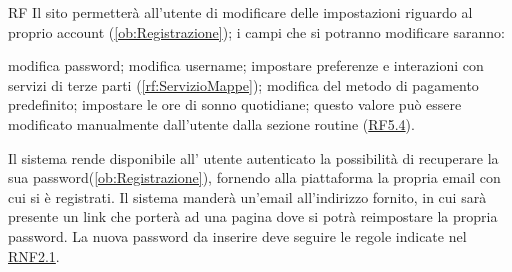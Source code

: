 \begin{listaPersonale}{RF}
	 Il sito permetterà all'utente di modificare delle impostazioni riguardo al proprio account (\ref{ob:Registrazione}); i campi che si potranno modificare saranno:
	\begin{listaPersonale2}{}
		 modifica password;
		 modifica username;
		 impostare preferenze e interazioni con servizi di terze parti (\ref{rf:ServizioMappe});
		 modifica del metodo di pagamento predefinito;
		 impostare le ore di sonno quotidiane; questo valore può essere modificato manualmente dall'utente dalla sezione routine (\hyperref[rf:RoutineEvento]{RF5.4}).
	\end{listaPersonale2}

	Il sistema rende disponibile all' utente autenticato la possibilità di recuperare la sua password(\ref{ob:Registrazione}), fornendo alla piattaforma la propria email con cui si è registrati. Il sistema manderà un'email all'indirizzo fornito, in cui sarà presente un link che porterà ad una pagina dove si potrà reimpostare la propria password. La nuova password da inserire deve seguire le regole indicate nel  \hyperref[rnf:SicurezzaPassword]{RNF2.1}. %
\end{listaPersonale}